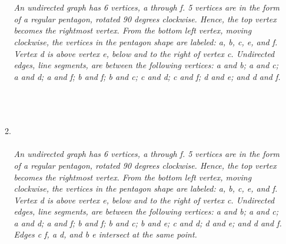 \documentclass{amsart}
\theoremstyle{definition}
\theoremstyle{Exercise}
\theoremstyle{remark}
\theoremstyle{rule}
\numberwithin{equation}{section}
\begin{document}
\begin{enumerate}[label=(\alph*)]
\begin{enumerate}[label=(\roman*)]
{}
\\\\
{\color{blue}{\bf Figure 11:} \emph{An undirected graph has 6 vertices, a through f. 5 vertices are in the form of a regular pentagon, rotated 90 degrees clockwise. Hence, the top vertex becomes the rightmost vertex. From the bottom left vertex, moving clockwise, the vertices in the pentagon shape are labeled: a, b, c, e, and f. Vertex d is above vertex e, below and to the right of vertex c. Undirected edges, line segments, are between the following vertices: a and b; a and c; a and d; a and f; b and f; b and c; c and d; c and f; d and e; and d and f.
}
}
\\\\
\\\\
\item {}
\\\\
{\color{blue}{\bf Figure 12:} \emph{An undirected graph has 6 vertices, a through f. 5 vertices are in the form of a regular pentagon, rotated 90 degrees clockwise. Hence, the top vertex becomes the rightmost vertex. From the bottom left vertex, moving clockwise, the vertices in the pentagon shape are labeled: a, b, c, e, and f. Vertex d is above vertex e, below and to the right of vertex c. Undirected edges, line segments, are between the following vertices: a and b; a and c; a and d; a and f; b and f; b and c; b and e; c and d; d and e; and d and f. Edges c f, a d, and b e intersect at the same point.
\\
}
}
\\\\

\end{enumerate}
\end{enumerate}
 \newpage
\end{document}
